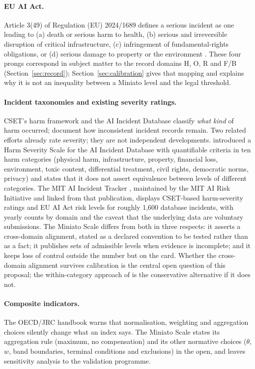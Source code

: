 \documentclass[11pt,a4paper]{article}
\begin{document}
\paragraph{EU AI Act.} Article 3(49) of Regulation (EU) 2024/1689 defines a serious incident as one leading to (a) death or serious harm to health, (b) serious and irreversible disruption of critical infrastructure, (c) infringement of fundamental-rights obligations, or (d) serious damage to property or the environment \citep{euaiact2024}. These four prongs correspond in subject matter to the record domains H, O, R and F/B (Section~\ref{sec:record}); Section~\ref{sec:calibration} gives that mapping and explains why it is not an inequality between a Miniato level and the legal threshold.

\paragraph{Incident taxonomies and existing severity ratings.} CSET's harm framework \citep{hoffmann2023harm} and the AI Incident Database \citep{mcgregor2021aiid} classify \emph{what kind} of harm occurred; \citet{turri2023documentation} document how inconsistent incident records remain. Two related efforts already rate severity; they are not independent developments. \citet{mylius2025} introduced a Harm Severity Scale for the AI Incident Database with quantifiable criteria in ten harm categories (physical harm, infrastructure, property, financial loss, environment, toxic content, differential treatment, civil rights, democratic norms, privacy) and states that it does not assert equivalence between levels of different categories. The MIT AI Incident Tracker \citep{mitaitracker}, maintained by the MIT AI Risk Initiative and linked from that publication, displays CSET-based harm-severity ratings and EU AI Act risk levels for roughly 1,600 database incidents, with yearly counts by domain and the caveat that the underlying data are voluntary submissions. The Miniato Scale differs from both in three respects: it asserts a cross-domain alignment, stated as a declared convention to be tested rather than as a fact; it publishes sets of admissible levels when evidence is incomplete; and it keeps loss of control outside the number but on the card. Whether the cross-domain alignment survives calibration is the central open question of this proposal; the within-category approach of \citet{mylius2025} is the conservative alternative if it does not.

\paragraph{Composite indicators.} The OECD/JRC handbook \citep{oecdjrc2008} warns that normalisation, weighting and aggregation choices silently change what an index says. The Miniato Scale states its aggregation rule (maximum, no compensation) and its other normative choices ($\theta$, $w$, band boundaries, terminal conditions and exclusions) in the open, and leaves sensitivity analysis to the validation programme.
\end{document}
